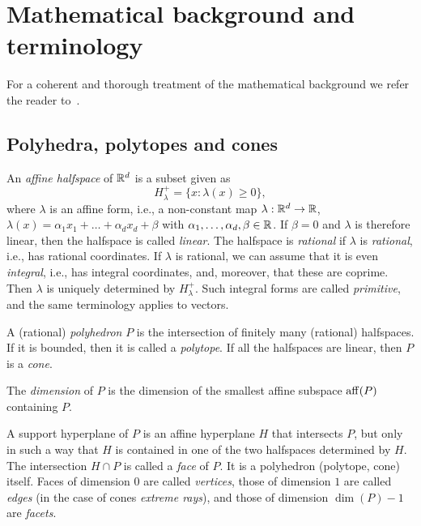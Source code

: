 
\appendix

\section{Mathematical background and terminology}\label{AppBackground}

For a coherent and thorough treatment of the mathematical background we refer the reader to~\cite{BG}.

\subsection{Polyhedra, polytopes and cones}

An \emph{affine halfspace} of ${\mathbb R}^d$ is a subset given as
$$
H_\lambda^+=\{x: \lambda(x)\ge 0\},
$$
where $\lambda$ is an affine form, i.e., a non-constant map $\lambda:{\mathbb R}^d\to{\mathbb R}$, $\lambda(x)=\alpha_1x_1+\dots+\alpha_dx_d+\beta$ with $\alpha_1,\dots,\alpha_d,\beta\in{\mathbb R}$. If $\beta=0$ and $\lambda$ is therefore linear, then the halfspace is called \emph{linear}. The halfspace is \emph{rational} if $\lambda$ is \emph{rational}, i.e., has rational coordinates. If $\lambda$ is rational, we can assume that it is even \emph{integral}, i.e., has integral coordinates, and, moreover, that these are coprime. Then $\lambda$ is uniquely determined by $H_\lambda^+$. Such integral forms are called \emph{primitive}, and the same terminology applies to vectors.

\begin{definition}
	A (rational) \emph{polyhedron} $P$ is the intersection of finitely many (rational) halfspaces. If it is bounded, then it is called a \emph{polytope}. If all the halfspaces are linear, then $P$ is a \emph{cone}.
	
	The \emph{dimension} of $P$ is the dimension of the smallest affine subspace $\operatorname{aff}(P)$ containing $P$.
\end{definition}


A support hyperplane of $P$ is an affine hyperplane $H$ that intersects $P$, but only in such a way that $H$ is contained in one of the two halfspaces determined by $H$. The intersection $H\cap P$ is called a \emph{face} of $P$. It is a polyhedron (polytope, cone) itself. Faces of dimension $0$ are called \emph{vertices}, those of dimension $1$ are called \emph{edges} (in the case of cones \emph{extreme rays}), and those of dimension $\dim(P)-1$ are \emph{facets}.

